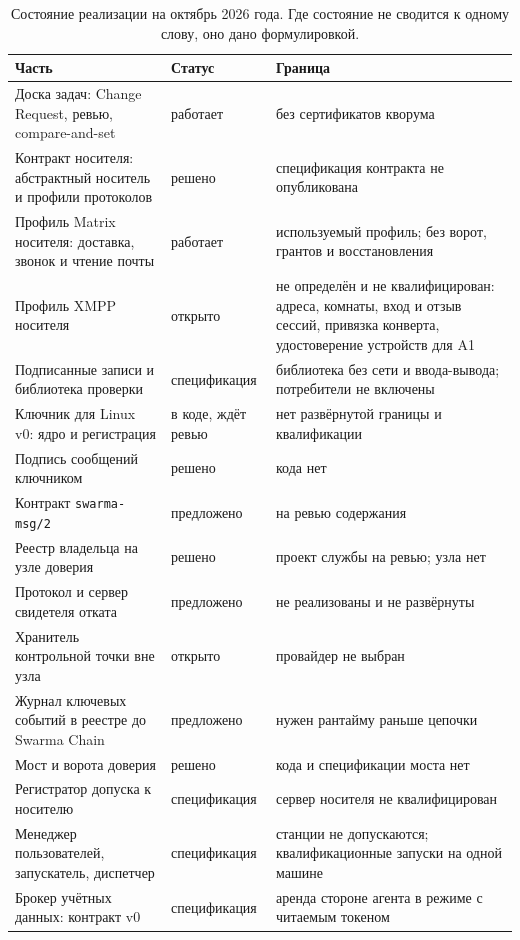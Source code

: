 \documentclass[10pt,a4paper]{article}
\begin{document}
\begin{table}[h]
\centering\small
\caption{Состояние реализации на октябрь 2026 года. Где состояние не сводится к одному слову, оно дано формулировкой.}
\label{tab:status}
\footnotesize
\begin{tabular}{L{6.3cm}L{2.5cm}L{6.9cm}}
\toprule
Часть & Статус & Граница \\
\midrule
Доска задач: Change Request, ревью, compare-and-set & работает & без сертификатов кворума \\
Контракт носителя: абстрактный носитель и профили протоколов & решено & спецификация контракта не опубликована \\
Профиль Matrix носителя: доставка, звонок и чтение почты & работает & используемый профиль; без ворот, грантов и восстановления \\
Профиль XMPP носителя & открыто & не определён и не квалифицирован: адреса, комнаты, вход и отзыв сессий, привязка конверта, удостоверение устройств для A1 \\
Подписанные записи и библиотека проверки & спецификация & библиотека без сети и ввода-вывода; потребители не включены \\
Ключник для Linux v0: ядро и регистрация & в коде, ждёт ревью & нет развёрнутой границы и квалификации \\
Подпись сообщений ключником & решено & кода нет \\
Контракт \texttt{swarma-msg/2} & предложено & на ревью содержания \\
Реестр владельца на узле доверия & решено & проект службы на ревью; узла нет \\
Протокол и сервер свидетеля отката & предложено & не реализованы и не развёрнуты \\
Хранитель контрольной точки вне узла & открыто & провайдер не выбран \\
Журнал ключевых событий в реестре до Swarma Chain & предложено & нужен рантайму раньше цепочки \\
Мост и ворота доверия & решено & кода и спецификации моста нет \\
Регистратор допуска к носителю & спецификация & сервер носителя не квалифицирован \\
Менеджер пользователей, запускатель, диспетчер & спецификация & станции не допускаются; квалификационные запуски на одной машине \\
Брокер учётных данных: контракт v0 & спецификация & аренда стороне агента в режиме с читаемым токеном \\

\end{tabular}
\end{table}
\end{document}
